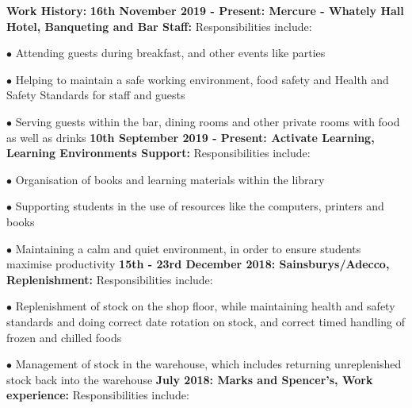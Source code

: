 \documentclass[10pt,a4paper]{book}
\begin{document}
\begin{flushleft}
  \textbf {Work History:}
  \linebreak{}
  \linebreak{}
  \textbf {16th November 2019 - Present: Mercure - Whately Hall Hotel, Banqueting and Bar Staff:}
  \linebreak{}
  Responsibilities include:

\item[$\bullet$] Attending guests during breakfast, and other events like parties

\item[$\bullet$] Helping to maintain a safe working environment, food safety and Health and Safety Standards for staff and guests

\item[$\bullet$] Serving guests within the bar, dining rooms and other private rooms with food as well as drinks
  \linebreak{}
  \linebreak{}
  \textbf {10th September 2019 - Present: Activate Learning, Learning Environments Support:}
  \linebreak{}
  Responsibilities include:

\item[$\bullet$] Organisation of books and learning materials within the library

\item[$\bullet$] Supporting students in the use of resources like the computers, printers and books

\item[$\bullet$] Maintaining a calm and quiet environment, in order to ensure students maximise productivity
  \linebreak{}
  \linebreak{}
\textbf {15th - 23rd December 2018: Sainsburys/Adecco, Replenishment:}
  \linebreak{}
  Responsibilities include:

\item[$\bullet$] Replenishment of stock on the shop floor, while maintaining health and safety standards and doing correct date rotation on stock, and correct timed handling of frozen and chilled foods

\item[$\bullet$] Management of stock in the warehouse, which includes returning unreplenished stock back into the warehouse
  \linebreak{}
  \linebreak{}
\textbf {July 2018: Marks and Spencer's, Work experience:}
  \linebreak{}
Responsibilities include:


\end{flushleft}
\end{document}
